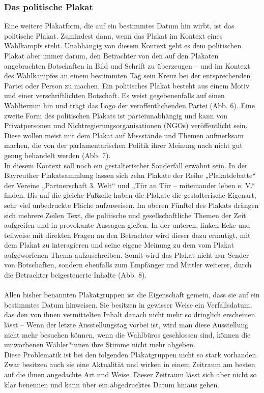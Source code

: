 \documentclass[a4paper,12pt,ngerman]{article}
\begin{document}
\subsubsection{Das politische Plakat}
Eine weitere Plakatform, die auf ein bestimmtes Datum hin wirbt, ist das politische Plakat. Zumindest dann, wenn das Plakat im Kontext eines Wahlkampfs steht. Unabhängig von diesem Kontext geht es dem politischen Plakat aber immer darum, den Betrachter von den auf den Plakaten angebrachten Botschaften in Bild und Schrift zu überzeugen -- und im Kontext des Wahlkampfes an einem bestimmten Tag sein Kreuz bei der entsprechenden Partei oder Person zu machen. Ein politisches Plakat besteht aus einem Motiv und einer verschriftlichten Botschaft. Es weist gegebenenfalls auf einen Wahltermin hin und trägt das Logo der veröffentlichenden Partei (Abb. 6). Eine zweite Form des politischen Plakats ist parteiunabhängig und kann von Privatpersonen und Nichtregierungsorganisationen (NGOs) veröffentlicht sein. Diese wollen meist mit dem Plakat auf Missstände und Themen aufmerksam machen, die von der parlamentarischen Politik ihrer Meinung nach nicht gut genug behandelt werden (Abb. 7). \\
In diesem Kontext soll noch ein gestalterischer Sonderfall erwähnt sein. In der Bayreuther Plakatsammlung lassen sich zehn Plakate der Reihe „Plakatdebatte“ der Vereine „Partnerschaft 3. Welt“ und „Tür an Tür -- miteinander leben e. V.“  finden. Bis auf die gleiche Fußzeile haben die Plakate die gestalterische Eigenart, sehr viel unbedruckte Fläche aufzuweisen. Im oberen Fünftel des Plakats drängen sich mehrere Zeilen Text, die politische und gesellschaftliche Themen der Zeit aufgreifen und in provokante Aussagen gießen. In der unteren, linken Ecke und teilweise mit direkten Fragen an den Betrachter wird dieser dazu ermutigt, mit dem Plakat zu interagieren und seine eigene Meinung zu dem vom Plakat aufgeworfenen Thema aufzuschreiben. Somit wird das Plakat nicht nur Sender von Botschaften, sondern ebenfalls zum Empfänger und Mittler weiterer, durch die Betrachter beigesteuerte Inhalte (Abb. 8). \\
\\
Allen bisher benannten Plakatgruppen ist die Eigenschaft gemein, dass sie auf ein bestimmtes Datum hinweisen. Sie besitzen in gewisser Weise ein Verfallsdatum, das den von ihnen vermittelten Inhalt danach nicht mehr so dringlich erscheinen lässt -- Wenn der letzte Ausstellungstag vorbei ist, wird man diese Ausstellung nicht mehr besuchen können, wenn die Wahlbüros geschlossen sind, können die umworbenen Wähler*innen ihre Stimme nicht mehr abgeben.\\
Diese Problematik ist bei den folgenden Plakatgruppen nicht so stark vorhanden. Zwar besitzen auch sie eine Aktualität und wirken in einem Zeitraum am besten auf die ihnen angedachte Art und Weise. Dieser Zeitraum lässt sich aber nicht so klar benennen und kann über ein abgedrucktes Datum hinaus gehen. \\
\end{document}
